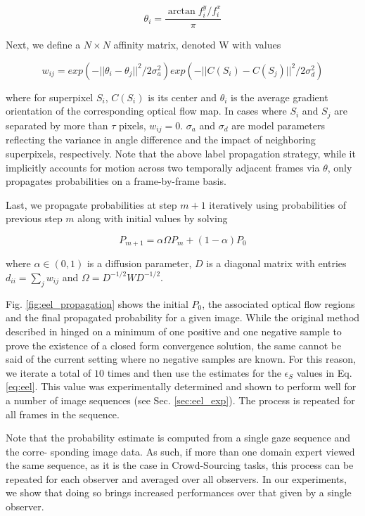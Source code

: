 \begin{equation}
\theta_{i} = \frac{\arctan{f_{i}^{y}} / f_{i}^{x}}{\pi}
\end{equation}

Next, we define a $N \times N$ affinity matrix, denoted W with values

\begin{equation}
w_{ij} = exp(-||\theta_{i} - \theta_{j}||^2 / 2\sigma_{a}^{2}) exp(-||C(S_i) - C(S_j)||^2 / 2\sigma_{d}^{2})
\end{equation}

where for superpixel $S_{i}$, $C(S_{i})$ is its center and $\theta_{i}$ is the average gradient orientation of
the corresponding optical flow map.
In cases where $S_{i}$ and $S_{j}$ are separated by more than $\tau$ pixels, $w_{ij}=0$.
$\sigma_{a}$ and $\sigma_{d}$ are model parameters reflecting the variance in angle difference and the impact of neighboring superpixels, respectively.
Note that the above label propagation strategy, while it implicitly accounts for motion
across two temporally adjacent frames
via $\theta$, only propagates probabilities on a frame-by-frame basis.

Last, we propagate probabilities at step $m+1$ iteratively using probabilities of previous step $m$
along with initial values by solving

\begin{equation}
P_{m+1} = \alpha \Omega P_{m} + (1 - \alpha)P_{0}
\end{equation}

where $\alpha \in (0,1)$ is a diffusion parameter, $D$ is a diagonal matrix with entries $d_{ii}=\sum_{j}w_{ij}$ and $\Omega = D^{-1/2} W D^{-1/2}$.

Fig. \ref{fig:eel_propagation} shows the initial $P_{0}$, the associated optical flow regions and the final propagated probability for a given image.
While the original method described in \cite{zhou04} hinged on a minimum of one positive and one negative sample to prove the existence of a closed form convergence solution, the same cannot be said of the current setting where no negative samples are known.
For this reason, we iterate a total of $10$ times and then use the estimates for the $\epsilon_{S}$
values in Eq. \ref{eq:eel}.
This value was experimentally determined and shown to perform well for a
number of image sequences (see Sec. \ref{sec:eel_exp}).
The process is repeated for all frames in the sequence.

Note that the probability estimate is computed from a single gaze sequence and the corre-
sponding image data. As such, if more than one domain expert viewed the same sequence, as it
is the case in Crowd-Sourcing tasks, this process can be repeated for each observer and averaged
over all observers.
In our experiments, we show that doing so brings increased performances over that given by a single observer.


